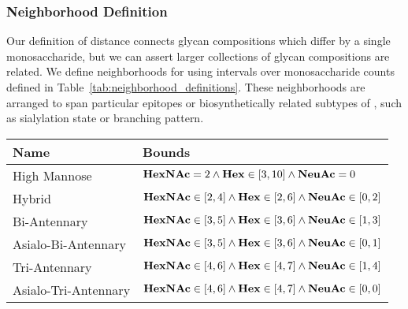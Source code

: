     \subsubsection{Neighborhood Definition}
        Our definition of distance connects glycan compositions which differ
        by a single monosaccharide, but we can assert larger collections of
        glycan compositions are related. We define neighborhoods for \nglycans
        using intervals over monosaccharide counts defined in
        Table~\ref{tab:neighborhood_definitions}. These neighborhoods are
        arranged to span particular epitopes or biosynthetically related
        subtypes of \nglycans, such as sialylation state or branching
        pattern.

        \begin{table}[tb]
            \centering
            \small
            \begin{tabular}[h]{l p{8cm}}
                \toprule
                Name & Bounds \\
                \midrule
                High Mannose & ${\bf HexNAc} = 2 \land
                                {\bf Hex} \in [3, 10]
                                \land {\bf NeuAc} = 0$\\
                Hybrid & ${\bf HexNAc} \in [2, 4] \land
                          {\bf Hex} \in [2, 6]
                          \land {\bf NeuAc} \in [0, 2]$\\
                Bi-Antennary & ${\bf HexNAc} \in [3, 5]
                                \land {\bf Hex} \in [3, 6]
                                \land {\bf NeuAc} \in [1, 3]$\\
                Asialo-Bi-Antennary & ${\bf HexNAc} \in [3, 5]
                                \land {\bf Hex} \in [3, 6]
                                \land {\bf NeuAc} \in [0, 1]$\\
                Tri-Antennary & $
                    {\bf HexNAc} \in [4, 6]
                    \land {\bf Hex} \in [4, 7]
                    \land {\bf NeuAc} \in [1, 4]
                $\\
                Asialo-Tri-Antennary & $
                    {\bf HexNAc} \in [4, 6]
                    \land {\bf Hex} \in [4, 7]
                    \land {\bf NeuAc} \in [0, 0]
                $\\

\end{tabular}
\end{table}
